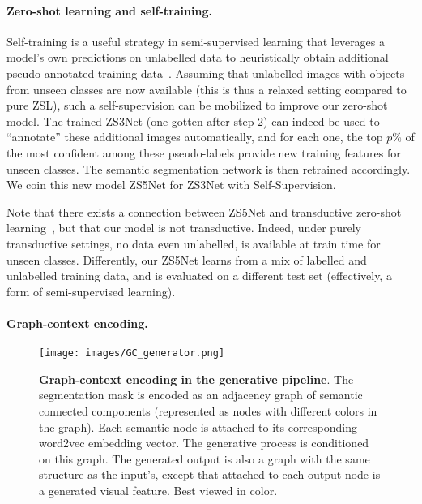 \documentclass{article}
\begin{document}
\vspace{-0.3cm}
\paragraph{Zero-shot learning and self-training.}

Self-training is a useful strategy in semi-supervised learning that leverages a model's own predictions on unlabelled data to heuristically obtain additional pseudo-annotated training data~\cite{zhu2005semi}.
Assuming that unlabelled images with objects from unseen classes are now available (this is thus a relaxed setting compared to pure ZSL), such a self-supervision can be mobilized to improve our zero-shot model. 
The trained ZS3Net (one gotten after step 2) can indeed be used to ``annotate'' these additional images automatically, and for each one, the top $p\%$ of the most confident among these pseudo-labels provide new training features for unseen classes. 
The semantic segmentation network is then retrained accordingly.
We coin this new model ZS5Net for ZS3Net with Self-Supervision.


Note that there exists a connection between ZS5Net and transductive zero-shot learning~\cite{li2017zero, song2018transductive, zhang2016zero}, but that our model is not transductive.
Indeed, under purely transductive settings, no data even unlabelled, is available at train time for unseen classes.
Differently, our ZS5Net learns from a mix of labelled and unlabelled training data, and is evaluated on a different test set (effectively, a form of semi-supervised learning).



\vspace{-0.3cm}
\paragraph{Graph-context encoding.} 

\begin{figure}[h]
\centering
\texttt{[image: images/GC\_generator.png]}
\caption{\small \textbf{Graph-context encoding in the generative pipeline}. The segmentation mask is encoded as an adjacency graph of semantic connected components (represented as nodes with different colors in the graph). Each semantic node is attached to its corresponding word2vec embedding vector. The generative process is conditioned on this graph. The generated output is also a graph with the same structure as the input's, except that attached to each output node is a generated visual feature.  Best viewed in color.}
\vspace{-0.3cm}
\label{fig:gc_gen}
\end{figure}
\end{document}

